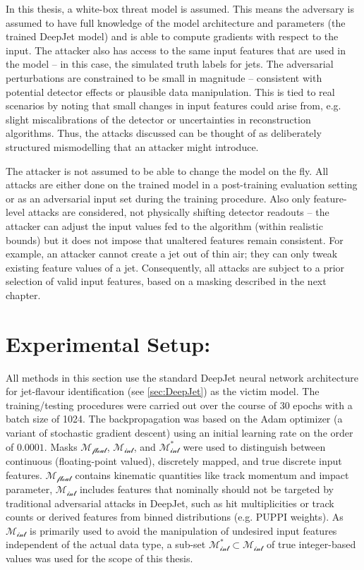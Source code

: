 In this thesis, a white-box threat model is assumed. This means the adversary is assumed to have full knowledge of the model architecture and parameters (the trained DeepJet model) and is able to compute gradients with respect to the input. The attacker also has access to the same input features that are used in the model – in this case, the simulated truth labels for jets. The adversarial perturbations are constrained to be small in magnitude – consistent with potential detector effects or plausible data manipulation. This is tied to real scenarios by noting that small changes in input features could arise from, e.g. slight miscalibrations of the detector or uncertainties in reconstruction algorithms. Thus, the attacks discussed can be thought of as deliberately structured mismodelling that an attacker might introduce.

The attacker is not assumed to be able to change the model on the fly. All attacks are either done on the trained model in a post-training evaluation setting or as an adversarial input set during the training procedure. Also only feature-level attacks are considered, not physically shifting detector readouts – the attacker can adjust the input values fed to the algorithm (within realistic bounds) but it does not impose that unaltered features remain consistent. For example, an attacker cannot create a jet out of thin air; they can only tweak existing feature values of a jet. Consequently, all attacks are subject to a prior selection of valid input features, based on a masking described in the next chapter.


\section{Experimental Setup:}
All methods in this section use the standard DeepJet neural network architecture for jet-flavour identification (see \ref{sec:DeepJet}) as the victim model. The training/testing procedures were carried out over the course of 30 epochs with a batch size of 1024. The backpropagation was based on the Adam optimizer (a variant of stochastic gradient descent) using an initial learning rate on the order of $0.0001$. 
Masks $\mathcal{M_{\text{float}}}$, $\mathcal{M_{\text{int}}}$, and $\mathcal{M_{\text{int}}^*}$ were used to distinguish between continuous (floating-point valued), discretely mapped, and true discrete input features. 
$\mathcal{M_{\text{float}}}$ contains kinematic quantities like track momentum and impact parameter, $\mathcal{M_{\text{int}}}$ includes features that nominally should not be targeted by traditional adversarial attacks in DeepJet, such as hit multiplicities or track counts or derived features from binned distributions (e.g. PUPPI weights). As $\mathcal{M_{\text{int}}}$ is primarily used to avoid the manipulation of undesired input features independent of the actual data type, a sub-set $\mathcal{M_{\text{int}}^*}\subset\mathcal{M_{\text{int}}}$ of true integer-based values was used for the scope of this thesis. 

